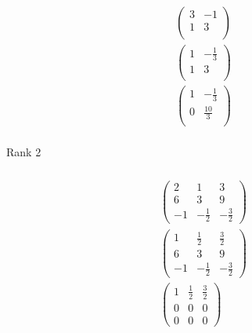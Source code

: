 \documentclass{article}
\begin{document}
\subsubsection{}

\begin{align*}
  \begin{pmatrix}
    3 & -1 \\
    1 & 3  \\
  \end{pmatrix}   \\
  \begin{pmatrix}
    1 & -\frac{1}{3} \\
    1 & 3            \\
  \end{pmatrix} \\
  \begin{pmatrix}
    1 & -\frac{1}{3} \\
    0 & \frac{10}{3} \\
  \end{pmatrix} \\
\end{align*}

Rank 2

\setcounter{subsubsection}{2}
\subsubsection{}

\begin{align*}
  \begin{pmatrix}
    2  & 1            & 3            \\
    6  & 3            & 9            \\
    -1 & -\frac{1}{2} & -\frac{3}{2}
  \end{pmatrix} \\
  \begin{pmatrix}
    1  & \frac{1}{2}  & \frac{3}{2}  \\
    6  & 3            & 9            \\
    -1 & -\frac{1}{2} & -\frac{3}{2}
  \end{pmatrix} \\
  \begin{pmatrix}
    1 & \frac{1}{2} & \frac{3}{2} \\
    0 & 0           & 0           \\
    0 & 0           & 0
  \end{pmatrix}    \\
\end{align*}
\end{document}
